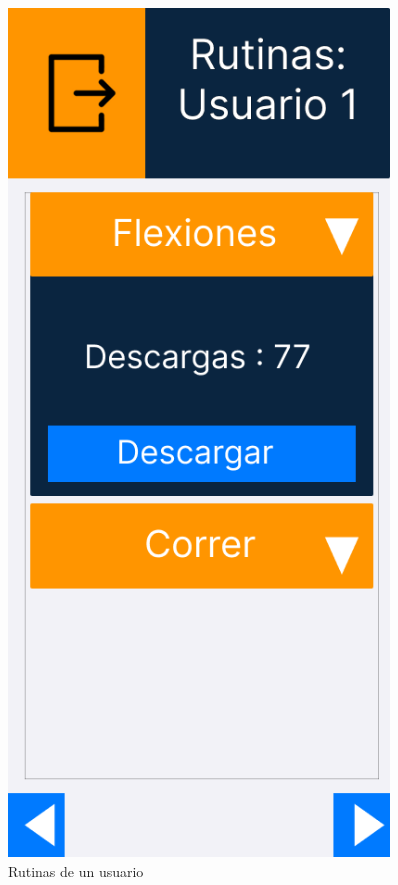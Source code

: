 \begin{figure}[H]
   \centering
   \begin{minipage}{0.45\textwidth}
      \centering
      \includegraphics[width=0.9\textwidth]{fotos/Frame 56.png}
      \caption{Rutinas de un usuario}

\end{minipage}
\end{figure}
